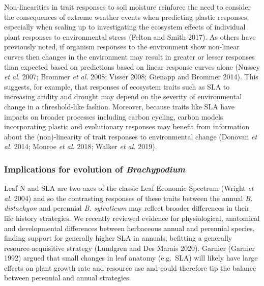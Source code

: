 \documentclass[jou,floatsintext]{apa6}
\begin{document}
Non-linearities in trait responses to soil moisture reinforce the need to consider the consequences of extreme weather events when predicting plastic responses, especially when scaling up to investigating the ecosystem effects of individual plant responses to environmental stress (Felton and Smith 2017). As others have previously noted, if organism responses to the environment show non-linear curves then changes in the environment may result in greater or lesser responses than expected based on predictions based on linear response curves alone (Nussey \emph{et al.} 2007; Brommer \emph{et al.} 2008; Visser 2008; Gienapp and Brommer 2014). This suggests, for example, that responses of ecosystem traits such as SLA to increasing aridity and drought may depend on the severity of environmental change in a threshold-like fashion. Moreover, because traits like SLA have impacts on broader processes including carbon cycling, carbon models incorporating plastic and evolutionary responses may benefit from information about the (non)-linearity of trait responses to environmental change (Donovan \emph{et al.} 2014; Monroe \emph{et al.} 2018; Walker \emph{et al.} 2019).

\hypertarget{implications-for-evolution-of-brachypodium}{%
\subsubsection{\texorpdfstring{Implications for evolution of \emph{Brachypodium}}{Implications for evolution of Brachypodium}}\label{implications-for-evolution-of-brachypodium}}

Leaf N and SLA are two axes of the classic Leaf Economic Spectrum (Wright \emph{et al.} 2004) and so the contrasting responses of these traits between the annual \emph{B. distachyon} and perennial \emph{B. sylvaticum} may reflect broader differences in their life history strategies. We recently reviewed evidence for physiological, anatomical and developmental differences between herbaceous annual and perennial species, finding support for generally higher SLA in annuals, befitting a generally resource-acquisitive strategy (Lundgren and Des Marais 2020). Garnier (Garnier 1992) argued that small changes in leaf anatomy (e.g.~SLA) will likely have large effects on plant growth rate and resource use and could therefore tip the balance between perennial and annual strategies.
\end{document}
